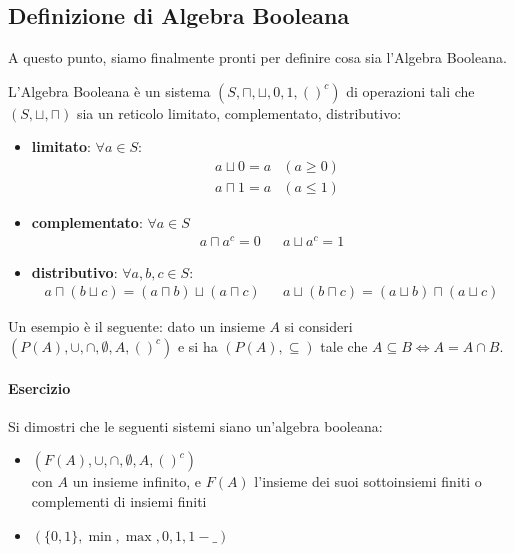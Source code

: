 \subsection{Definizione di Algebra Booleana}
A questo punto, siamo finalmente pronti per definire cosa sia l'Algebra Booleana.
\begin{defi}
L'Algebra Booleana è un sistema $(S, \sqcap, \sqcup, 0, 1, ()^c)$ di operazioni tali che $(S,\sqcup,\sqcap)$ sia un reticolo limitato, complementato, distributivo:
\begin{itemize}
  \item \textbf{limitato}: $\forall a \in S$:
    \begin{align*}
      & a \sqcup 0 = a & (a \geq 0) \\
      & a \sqcap 1 = a & (a \leq 1)
    \end{align*}
  \item \textbf{complementato}: $\forall a \in S$
    \begin{align*}
      a \sqcap a^c = 0 && a \sqcup a^c = 1
    \end{align*}
  \item \textbf{distributivo}: $\forall a,b, c \in S$:
    \begin{align*}
      a \sqcap (b \sqcup c) = (a \sqcap b) \sqcup (a \sqcap c) && a \sqcup (b \sqcap c) = (a \sqcup b) \sqcap ( a \sqcup c)
    \end{align*}
\end{itemize}
\end{defi}

Un esempio è il seguente: dato un insieme $A$ si consideri 
$(P(A), \cup, \cap, \emptyset, A, ()^c)$ e si ha 
$(P(A), \subseteq)$ tale che $A \subseteq B \iff A = A \cap B$. 

\paragraph{Esercizio}
Si dimostri che le seguenti sistemi siano un'algebra booleana:
\begin{itemize}
  \item $(F(A), \cup, \cap, \emptyset, A, ()^c)$ \\
    con $A$ un insieme infinito, e $F(A)$ l'insieme dei suoi sottoinsiemi finiti o complementi di insiemi finiti
  \item $(\{0,1\}, \min, \max, 0, 1, 1-\_)$
\end{itemize}

